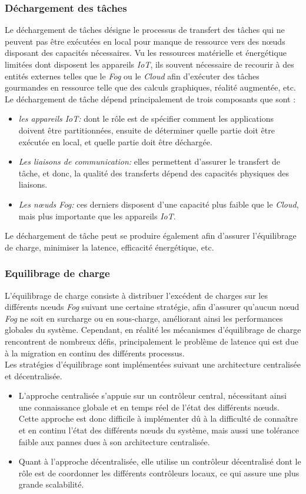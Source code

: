 \subsubsection{Déchargement des tâches}
Le déchargement de tâches désigne le processus de transfert des tâches qui ne peuvent pas être exécutées en local pour manque de ressource vers des nœuds disposant des capacités nécessaires. Vu les ressources matérielle et énergétique limitées dont disposent les appareils \emph{IoT}, ils souvent nécessaire de recourir à des entités externes telles que le \emph{Fog} ou le \emph{Cloud} afin d'exécuter des tâches gourmandes en ressource telle que des calculs graphiques, réalité augmentée, etc.\\
Le déchargement de tâche dépend principalement de trois composants que sont :
\begin{itemize}
  \item \emph{les appareils IoT:} dont le rôle est de spécifier comment les applications doivent être partitionnées, ensuite de déterminer quelle partie doit être exécutée en local, et quelle partie doit être déchargée.
  \item \emph{Les liaisons de communication:}  elles permettent d'assurer le transfert de tâche, et donc, la qualité des transferts dépend des capacités physiques des liaisons.
  \item \emph{Les nœuds Fog:} ces derniers disposent d'une capacité plus faible que le \emph{Cloud}, mais plus importante que les appareils \emph{IoT}.
\end{itemize}
Le déchargement de tâche peut se produire également afin d'assurer l'équilibrage de charge, minimiser la latence, efficacité énergétique, etc.
\subsubsection{Equilibrage de charge}
L'équilibrage de charge \cite{Ash2019} consiste à distribuer l'excédent de charges sur les différents nœuds \emph{Fog} suivant une certaine stratégie, afin d'assurer qu'aucun nœud \emph{Fog} ne soit en surcharge ou en sous-charge, améliorant ainsi les performances globales du système. Cependant, en réalité les mécanismes d'équilibrage de charge rencontrent de nombreux défis, principalement le problème de latence qui est due à la migration en continu des différents processus.\\
Les stratégies d'équilibrage sont implémentées suivant une architecture centralisée et décentralisée.
\begin{itemize}
  \item L'approche centralisée s'appuie sur un contrôleur central, nécessitant ainsi une connaissance globale et en temps réel de l'état des différents nœuds.
  Cette approche est donc difficile à implémenter dû à la difficulté de connaître et en continu l'état des différents nœuds du système, mais aussi une tolérance faible aux pannes dues à son architecture centralisée.
  \item Quant à l'approche décentralisée, elle utilise un contrôleur décentralisé dont le rôle est de coordonner les différents contrôleurs locaux, ce qui assure une plus grande scalabilité.
\end{itemize}
